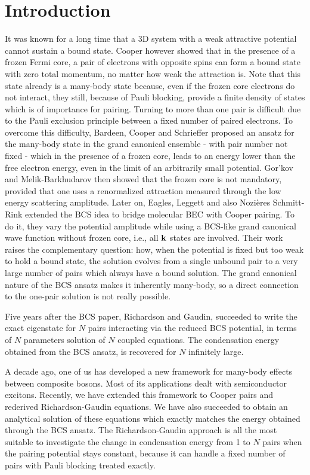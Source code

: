 \documentclass[5p,twocolumn]{elsarticle}
\begin{document}
\section{Introduction}
It was known for a long time that a 3D system with a weak attractive potential cannot sustain a bound state.  Cooper however showed that in the presence of a frozen Fermi core, a pair of electrons with opposite spins can form a bound state with zero total momentum,  no matter how weak the attraction is\cite{Cooper}.  Note that this state already is a many-body state because, even if the frozen core electrons do not interact, they still, because of  Pauli blocking, provide a finite density of states which is of importance for pairing. Turning to more than one pair is difficult due to the Pauli exclusion principle between a fixed number of paired electrons. To overcome this difficulty, Bardeen, Cooper and Schrieffer proposed an ansatz for the many-body state in the grand canonical ensemble - with  pair number not fixed - which in the presence of a frozen core, leads to an energy lower than the free electron energy, even in the limit of an arbitrarily small potential\cite{BCS}. Gor'kov and Melik-Barkhudarov then showed that the frozen core is not
  mandatory, provided that one uses a renormalized attraction measured through the low energy scattering amplitude\cite{Gorkov}.   Later on, Eagles\cite{Eagle}, Leggett\cite{LeggettCrossover} and also Nozi\`{e}res Schmitt-Rink\cite{Nozieres} extended the BCS  idea to bridge molecular BEC with Cooper pairing. To do it, they vary the potential amplitude while using a BCS-like grand canonical wave function without frozen core, i.e., all $\mathbf{k}$ states are involved.  Their work raises the complementary question: how, when the potential is fixed but too weak to hold a bound state, the solution evolves from a single unbound pair to a very large number of pairs which always have a bound solution. The grand canonical nature of the BCS ansatz makes it inherently many-body, so a direct connection to the one-pair solution is not really possible.  

Five years after the BCS paper, Richardson\cite{Richardson1} and Gaudin\cite{gaudin}, succeeded to write the exact eigenstate for $N$  pairs interacting via the reduced BCS potential, in terms of $N$ parameters solution of $N$ coupled equations. The condensation energy obtained from the BCS ansatz, is recovered for $N$ infinitely large\cite{Richardson2,Richardson3,Richardson1968}. 

A decade ago, one of us has developed a new framework\cite{CobosonPhysicsReports} for many-body effects between composite bosons. Most of its applications dealt with semiconductor excitons.   Recently, we have extended this framework to Cooper pairs and rederived Richardson-Gaudin equations\cite{CobosonBcsRich}. We have also succeeded to obtain an analytical solution of these equations \cite{moth,combescotBCS} which exactly matches the energy obtained through the BCS ansatz.  The Richardson-Gaudin approach is all the most suitable to investigate the change in condensation energy from 1 to $N$ pairs when the pairing potential stays constant, because it can handle a fixed number of pairs with Pauli blocking treated exactly.
\end{document}
